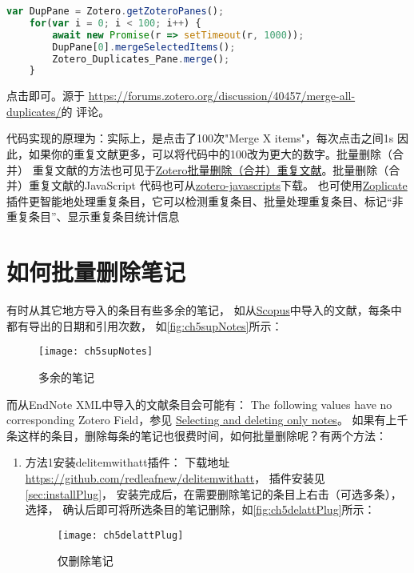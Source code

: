 \documentclass[theorem=false,mathfont=none,openany,sub3section]{easybook}
\begin{document}
{%
\begin{lstlisting}[language=JavaScript]
	var DupPane = Zotero.getZoteroPanes();
	for(var i = 0; i < 100; i++) {
		await new Promise(r => setTimeout(r, 1000));
		DupPane[0].mergeSelectedItems();
		Zotero_Duplicates_Pane.merge();
	}
\end{lstlisting}
点击即可。源于
\url{https://forums.zotero.org/discussion/40457/merge-all-duplicates/}的
评论。

代码实现的原理为：实际上，是点击了100次"Merge X items"，每次点击之间1s
因此，如果你的重复文献更多，可以将代码中的100改为更大的数字。批量删除（合并）
重复文献的方法也可见于\href{https://zhuanlan.zhihu.com/p/352324486}
{Zotero批量删除（合并）重复文献}。批量删除（合并）重复文献的JavaScript
代码也可从\href{https://github.com/redleafnew/zotero-javascripts}
{zotero-javascripts}下载。
也可使用\href{https://chenglongma.com/zoplicate/}{Zoplicate}插件更智能地处理重复条目，它可以检测重复条目、批量处理重复条目、标记“非重复条目”、显示重复条目统计信息

\section{如何批量删除笔记}\label{sec:batchDelNotes}
有时从其它地方导入的条目有些多余的笔记，
如从\href{https://www.scopus.com}{Scopus}中导入的文献，每条中都有导出的日期和引用次数，
如\autoref{fig:ch5supNotes}所示：
\begin{figure}[htbp]
	\centering
	\texttt{[image: ch5supNotes]}
	\caption{多余的笔记}
	\label{fig:ch5supNotes}
\end{figure}
而从EndNote XML中导入的文献条目会可能有：
The following values have no corresponding Zotero Field，参见
\href{https://forums.zotero.org/discussion/comment/390716#Comment_390716}{Selecting and deleting only notes}。
如果有上千条这样的条目，删除每条的笔记也很费时间，如何批量删除呢？有两个方法：
\begin{enumerate}
	\item 方法1安装delitemwithatt插件：
	下载地址\href{https://github.com/redleafnew/delitemwithatt}{https://github.com/redleafnew/delitemwithatt}，
	插件安装见\cref{sec:installPlug}，
	安装完成后，在需要删除笔记的条目上右击（可选多条），
	选择，
	确认后即可将所选条目的笔记删除，如\autoref{fig:ch5delattPlug}所示：
	\begin{figure}[htbp]
		\centering
		\texttt{[image: ch5delattPlug]}
		\caption{仅删除笔记}
		\label{fig:ch5delattPlug}
	\end{figure}
	

\end{enumerate}}
\end{document}
